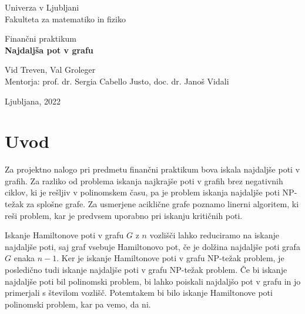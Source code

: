 \documentclass[a4paper, 9pt]{article}
\begin{document}
\begin{titlepage}
    \begin{center}

    \large
    Univerza v Ljubljani\\
        \normalsize
        Fakulteta za matematiko in fiziko\\

    \vspace{5 cm} 

        \large
        Finančni praktikum\\


    \vspace{0.5cm}
    \LARGE
        \textbf{Najdaljša pot v grafu}

    \vspace{0.5 cm}

    \large
        Vid Treven, Val Groleger \\


    \vspace{1.5cm}
    \normalsize
        Mentorja: prof. dr. Sergia Cabello Justo, doc. dr. Janoš Vidali
    \vspace{3cm}


    \vfill

        \large Ljubljana, 2022

    \end{center}
\end{titlepage}


\section{Uvod}
Za projektno nalogo pri predmetu finančni praktikum bova iskala najdaljše poti v grafih. Za razliko od problema iskanja najkrajše poti v grafih brez negativnih ciklov, ki je rešljiv v polinomskem času, pa je problem iskanja najdaljše poti NP-težak za splošne grafe. Za usmerjene aciklične grafe poznamo linerni algoritem, ki reši problem, kar je predvsem uporabno pri iskanju kritičnih poti. 

Iskanje Hamiltonove poti v grafu $G$ z $n$ vozlišči lahko reduciramo na iskanje najdaljše poti, saj graf vsebuje Hamiltonovo pot, če je dolžina najdaljše poti grafa $G$ enaka $n-1$. Ker je iskanje Hamiltonove poti v grafu NP-težak problem, je posledično tudi iskanje najdaljše poti v grafu NP-težak problem. Če bi iskanje najdaljše poti bil polinomski problem, bi lahko poiskali najdaljšo pot v grafu in jo primerjali s številom vozlišč. Potemtakem bi bilo iskanje Hamiltonove poti polinomski problem, kar pa vemo, da ni.
\end{document}
